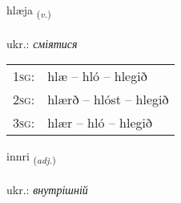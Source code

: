 \documentclass[frontgrid, backgrid]{flacards}\usepackage[]{graphicx}\usepackage[]{xcolor}
\begin{document}
\renewcommand{\flhead}{\vskip5pt \fboxsep=0pt {\small\bfseries\footnotesize Sagnorð | дієслово}}
\renewcommand{\fcfoot}{\vskip5pt \fboxsep=0pt \hspace{2pt}{\small\bfseries\footnotesize 2K}}

\renewcommand{\blhead}{\vskip5pt {\small\bfseries\footnotesize Sagnorð | дієслово }}
\renewcommand{\bcfoot}{\vskip5pt \hspace{2pt}{\small\bfseries\footnotesize 2K}}


{hlæja \small{\textsubscript{(\textit{v.})}} \\[1ex] %
\textphonetic{[l̥aiːja]} \\
ukr.: \emph{сміятися} \\  [2ex]
\renewcommand*{\arraystretch}{0.8}
\begin{tabular}{p{1cm}l}
\textsc{1sg}: & hlæ -- hló -- hlegið \\ 
\textsc{2sg}: & hlærð -- hlóst -- hlegið \\ 
\textsc{3sg}: & hlær -- hló -- hlegið \\ 
\end{tabular}
}

\renewcommand{\flhead}{\vskip5pt \fboxsep=0pt {\small\bfseries\footnotesize Lýsingarorð | прикметник}}
\renewcommand{\fcfoot}{\vskip5pt \fboxsep=0pt \hspace{2pt}{\small\bfseries\footnotesize 2K}}

\renewcommand{\blhead}{\vskip5pt {\small\bfseries\footnotesize Lýsingarorð | прикметник }}
\renewcommand{\bcfoot}{\vskip5pt \hspace{2pt}{\small\bfseries\footnotesize 2K}}


{innri \small{\textsubscript{(\textit{adj.})}} \\[1ex] %
\textphonetic{[ɪnrɪ]} \\
ukr.: \emph{внутрішній} \\  [2ex]
\renewcommand*{\arraystretch}{0.8}
}
\end{document}
